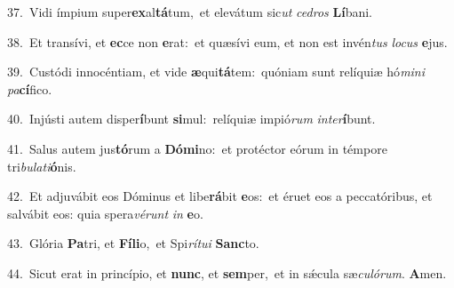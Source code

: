 {\numbfont\textcolor{\numbcolor}{37.}}~Vidi ímpium super\-\textbf{ex}\-al\-\textbf{tá}\-tum,~\star et elevátum sic\textit{ut} \textit{ce}\-\textit{dros} \textbf{Lí}\-bani.\par
{\numbfont\textcolor{\numbcolor}{38.}}~Et transívi, et \textbf{ec}\-ce non \textbf{e}\-rat:~\star et quæsívi eum, et non est invén\textit{tus} \textit{lo}\-\textit{cus} \textbf{e}\-jus.\par
{\numbfont\textcolor{\numbcolor}{39.}}~Custódi innocéntiam, et vide \textbf{æ}\-qui\-\textbf{tá}\-tem:~\star quóniam sunt relíquiæ hó\-\textit{mi}\-\textit{ni} \textit{pa}\-\textbf{cí}fico.\par
{\numbfont\textcolor{\numbcolor}{40.}}~Injústi autem disper\-\textbf{í}\-bunt \textbf{si}\-mul:~\star relíquiæ impió\textit{rum} \textit{in}\-\textit{ter}\textbf{í}bunt.\par
{\numbfont\textcolor{\numbcolor}{41.}}~Salus autem jus\-\textbf{tó}\-rum a \textbf{Dó}\-\textbf{mi}no:~\star et protéctor eórum in témpore tri\-\textit{bu}\-\textit{la}\textit{ti}\textbf{ó}nis.\par
{\numbfont\textcolor{\numbcolor}{42.}}~Et adjuvábit eos Dóminus et libe\-\textbf{rá}\-bit \textbf{e}\-os:~\star et éruet eos a peccatóribus, et salvábit eos: quia spera\-\textit{vé}\-\textit{runt} \textit{in} \textbf{e}\-o.\par
{\numbfont\textcolor{\numbcolor}{43.}}~Glória \textbf{Pa}\-tri, et \textbf{Fí}\-\textbf{li}o,~\star et Spi\-\textit{rí}\-\textit{tu}\textit{i} \textbf{Sanc}\-to.\par
{\numbfont\textcolor{\numbcolor}{44.}}~Sicut erat in princípio, et \textbf{nunc}\-, et \textbf{sem}\-per,~\star et in sǽcula sæ\-\textit{cu}\-\textit{ló}\textit{rum}. \textbf{A}\-men.\par
